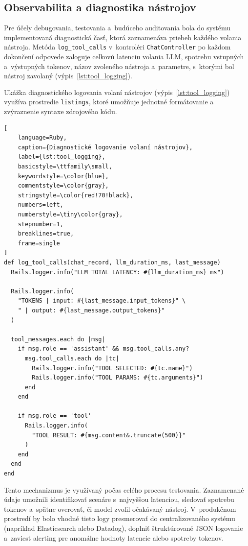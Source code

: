 \subsection{Observabilita a diagnostika nástrojov}
\label{sec:observabilita}

Pre účely debugovania, testovania a~budúceho auditovania bola do systému implementovaná
diagnostická časť, ktorá zaznamenáva priebeh každého volania nástroja. Metóda \texttt{log\_tool\_calls}
v~kontroléri \texttt{ChatController} po každom dokončení odpovede zaloguje celkovú
latenciu volania LLM, spotrebu vstupných a~výstupných tokenov, názov zvoleného nástroja
a~parametre, s~ktorými bol nástroj zavolaný (výpis~\ref{lst:tool_logging}).

Ukážka diagnostického logovania volaní nástrojov (výpis~\ref{lst:tool_logging})
využíva prostredie \texttt{listings}, ktoré umožňuje jednotné formátovanie a
zvýraznenie syntaxe zdrojového kódu.

\vspace{1\baselineskip}
\begin{lstlisting}[
    language=Ruby,
    caption={Diagnostické logovanie volaní nástrojov},
    label={lst:tool_logging},
    basicstyle=\ttfamily\small,
    keywordstyle=\color{blue},
    commentstyle=\color{gray},
    stringstyle=\color{red!70!black},
    numbers=left,
    numberstyle=\tiny\color{gray},
    stepnumber=1,
    breaklines=true,
    frame=single
]
def log_tool_calls(chat_record, llm_duration_ms, last_message)
  Rails.logger.info("LLM TOTAL LATENCY: #{llm_duration_ms} ms")

  Rails.logger.info(
    "TOKENS | input: #{last_message.input_tokens}" \
    " | output: #{last_message.output_tokens}"
  )

  tool_messages.each do |msg|
    if msg.role == 'assistant' && msg.tool_calls.any?
      msg.tool_calls.each do |tc|
        Rails.logger.info("TOOL SELECTED: #{tc.name}")
        Rails.logger.info("TOOL PARAMS: #{tc.arguments}")
      end
    end

    if msg.role == 'tool'
      Rails.logger.info(
        "TOOL RESULT: #{msg.content&.truncate(500)}"
      )
    end
  end
end
\end{lstlisting}

Tento mechanizmus je využívaný počas celého procesu testovania. Zaznamenané
údaje umožnili identifikovať scenáre s~najvyššou latenciou, sledovať spotrebu tokenov
a~spätne overovať, či model zvolil očakávaný nástroj. V~produkčnom prostredí by bolo
vhodné tieto logy presmerovať do centralizovaného systému (napríklad
Elasticsearch alebo Datadog), doplniť štruktúrované JSON logovanie a~zaviesť
alerting pre anomálne hodnoty latencie alebo spotreby tokenov.


